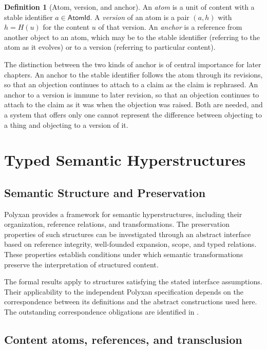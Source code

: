 \documentclass[11pt,twoside,openright]{book}
\theoremstyle{plain}
\theoremstyle{definition}
\newtheorem{definition}[theorem]{Definition}
\theoremstyle{remark}
\begin{document}
\begin{definition}[Atom, version, and anchor]\label{def:atom}
An \emph{atom} is a unit of content with a stable identifier $a\in\mathsf{AtomId}$. A \emph{version} of an atom is a pair $(a,h)$ with $h=H(u)$ for the content $u$ of that version. An \emph{anchor} is a reference from another object to an atom, which may be to the stable identifier (referring to the atom as it evolves) or to a version (referring to particular content).
\end{definition}

The distinction between the two kinds of anchor is of central importance for later chapters. An anchor to the stable identifier follows the atom through its revisions, so that an objection continues to attach to a claim as the claim is rephrased. An anchor to a version is immune to later revision, so that an objection continues to attach to the claim as it was when the objection was raised. Both are needed, and a system that offers only one cannot represent the difference between objecting to a thing and objecting to a version of it.

\chapter{Typed Semantic Hyperstructures}\label{ch:polyxan}

\section{Semantic Structure and Preservation}

Polyxan provides a framework for semantic hyperstructures,
including their organization, reference relations, and
transformations. The preservation properties of such structures
can be investigated through an abstract interface based on
reference integrity, well-founded expansion, scope, and typed
relations. These properties establish conditions under which
semantic transformations preserve the interpretation of
structured content.

The formal results apply to structures satisfying the stated
interface assumptions. Their applicability to the independent
Polyxan specification depends on the correspondence between
its definitions and the abstract constructions used here.
The outstanding correspondence obligations are identified
in .

\section{Content atoms, references, and transclusion}
\end{document}

